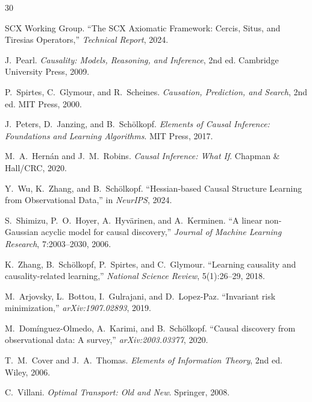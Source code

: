 \documentclass[12pt,a4paper]{article}
\begin{document}

\begin{thebibliography}{30}

SCX Working Group.
\newblock ``The SCX Axiomatic Framework: Cercis, Situs, and Tiresias Operators,''
\newblock \emph{Technical Report}, 2024.

J.~Pearl.
\newblock \emph{Causality: Models, Reasoning, and Inference}, 2nd ed.
\newblock Cambridge University Press, 2009.

P.~Spirtes, C.~Glymour, and R.~Scheines.
\newblock \emph{Causation, Prediction, and Search}, 2nd ed.
\newblock MIT Press, 2000.

J.~Peters, D.~Janzing, and B.~Sch\"olkopf.
\newblock \emph{Elements of Causal Inference: Foundations and Learning Algorithms}.
\newblock MIT Press, 2017.

M.~A.~Hern\'an and J.~M.~Robins.
\newblock \emph{Causal Inference: What If}.
\newblock Chapman \& Hall/CRC, 2020.

Y.~Wu, K.~Zhang, and B.~Sch\"olkopf.
\newblock ``Hessian-based Causal Structure Learning from Observational Data,''
\newblock in \emph{NeurIPS}, 2024.

S.~Shimizu, P.~O.~Hoyer, A.~Hyv\"arinen, and A.~Kerminen.
\newblock ``A linear non-Gaussian acyclic model for causal discovery,''
\newblock \emph{Journal of Machine Learning Research}, 7:2003--2030, 2006.

K.~Zhang, B.~Sch\"olkopf, P.~Spirtes, and C.~Glymour.
\newblock ``Learning causality and causality-related learning,''
\newblock \emph{National Science Review}, 5(1):26--29, 2018.

M.~Arjovsky, L.~Bottou, I.~Gulrajani, and D.~Lopez-Paz.
\newblock ``Invariant risk minimization,''
\newblock \emph{arXiv:1907.02893}, 2019.

M.~Dom\'inguez-Olmedo, A.~Karimi, and B.~Sch\"olkopf.
\newblock ``Causal discovery from observational data: A survey,''
\newblock \emph{arXiv:2003.03377}, 2020.

T.~M.~Cover and J.~A.~Thomas.
\newblock \emph{Elements of Information Theory}, 2nd ed.
\newblock Wiley, 2006.

C.~Villani.
\newblock \emph{Optimal Transport: Old and New}.
\newblock Springer, 2008.


\end{thebibliography}
\end{document}
